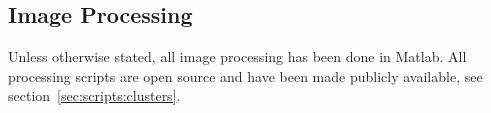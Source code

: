 \documentclass[../main.tex]{subfiles}
\begin{document}
\begin{comment}
\paragraph{Inducement time.} Generally it is recommended to induce some time after inoculating fresh media with overnight cultures; however this is not necessary if the proteins being induced are not toxic. Two parallel growths were done, OD measurements taken every two hours, and images recorded 4 hours after induction and four hours after inoculation.
\begin{center}
\begin{tabular}{ccc}
t=0	&	Inoculate	&	Inoculate \& Induce\\
2	&	Induce	&\\
4	&	Image	&	Image\\
6	&	Image	&
\end{tabular}
\end{center}

\paragraph{Inducer Titre} A logarithmic course of inducer concentrations was checked for expression of the same fusion protein under different promoters.

\begin{center}
\begin{tabular}{cc}
\textbf{Arabinose}	&	\textbf{IPTG} 	\\
0.001\%	&	\SI{1}{\micro\Molar}\\
0.003\%	&	\SI{3}{\micro\Molar}\\
0.01\%	&	\SI{10}{\micro\Molar}\\
0.03\%	&	\SI{30}{\micro\Molar}\\
0.1\%	&	\SI{100}{\micro\Molar}\\

\end{tabular}
\end{center}

\paragraph{Time Course}	A selection of inducer concentration from the inducer titre were re-run with samples being removed and imaged at \SI{2}{\hour}, \SI{3}{\hour} and \SI{4}{\hour} to find optimal expression.
 \end{comment}
\newpage
\subsection{Image Processing}
\label{sec:methods:imageprocessing}
Unless otherwise stated, all image processing has been done in Matlab. All processing scripts are open source and have been made publicly available, see section~\ref{sec:scripts:clusters}.
\end{document}

